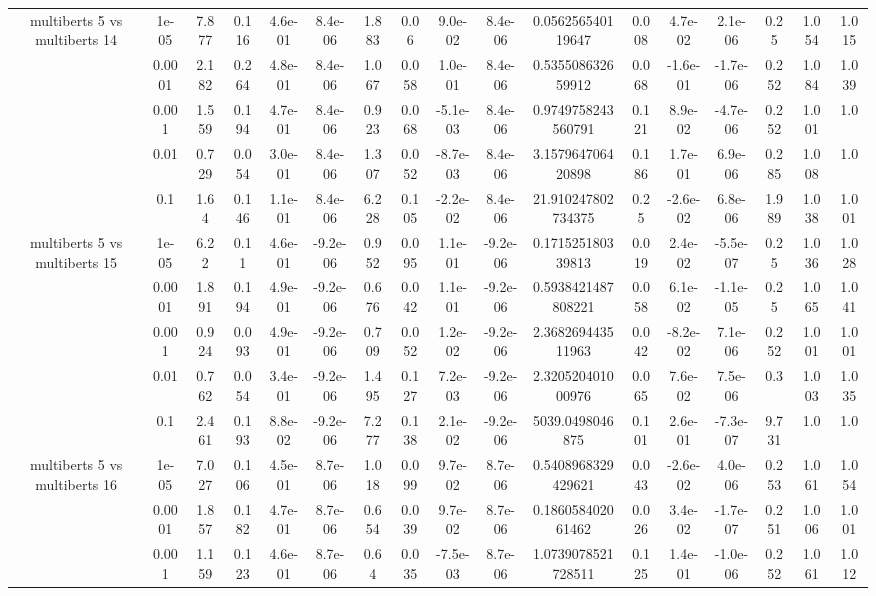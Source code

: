 \begin{tabular}{|c|c|c|c|c|c|c|c|c|c|c|c|c|c|c|c|c|}
\hline
\multirow{5}{*}{multiberts 5 vs multiberts 14} & 1e-05 & 7.877 & 0.116 & 4.6e-01 & 8.4e-06 & 1.883 & 0.06 & 9.0e-02 & 8.4e-06 & 0.056256540119647 & 0.008 & 4.7e-02 & 2.1e-06 & 0.25 & 1.054 & 1.015 \\
 & 0.0001 & 2.182 & 0.264 & 4.8e-01 & 8.4e-06 & 1.067 & 0.058 & 1.0e-01 & 8.4e-06 & 0.535508632659912 & 0.068 & -1.6e-01 & -1.7e-06 & 0.252 & 1.084 & 1.039 \\
 & 0.001 & 1.559 & 0.194 & 4.7e-01 & 8.4e-06 & 0.923 & 0.068 & -5.1e-03 & 8.4e-06 & 0.9749758243560791 & 0.121 & 8.9e-02 & -4.7e-06 & 0.252 & 1.001 & 1.0 \\
 & 0.01 & 0.729 & 0.054 & 3.0e-01 & 8.4e-06 & 1.307 & 0.052 & -8.7e-03 & 8.4e-06 & 3.157964706420898 & 0.186 & 1.7e-01 & 6.9e-06 & 0.285 & 1.008 & 1.0 \\
 & 0.1 & 1.64 & 0.146 & 1.1e-01 & 8.4e-06 & 6.228 & 0.105 & -2.2e-02 & 8.4e-06 & 21.910247802734375 & 0.25 & -2.6e-02 & 6.8e-06 & 1.989 & 1.038 & 1.001 \\
\hline
\multirow{5}{*}{multiberts 5 vs multiberts 15} & 1e-05 & 6.22 & 0.11 & 4.6e-01 & -9.2e-06 & 0.952 & 0.095 & 1.1e-01 & -9.2e-06 & 0.171525180339813 & 0.019 & 2.4e-02 & -5.5e-07 & 0.25 & 1.036 & 1.028 \\
 & 0.0001 & 1.891 & 0.194 & 4.9e-01 & -9.2e-06 & 0.676 & 0.042 & 1.1e-01 & -9.2e-06 & 0.5938421487808221 & 0.058 & 6.1e-02 & -1.1e-05 & 0.25 & 1.065 & 1.041 \\
 & 0.001 & 0.924 & 0.093 & 4.9e-01 & -9.2e-06 & 0.709 & 0.052 & 1.2e-02 & -9.2e-06 & 2.368269443511963 & 0.042 & -8.2e-02 & 7.1e-06 & 0.252 & 1.001 & 1.001 \\
 & 0.01 & 0.762 & 0.054 & 3.4e-01 & -9.2e-06 & 1.495 & 0.127 & 7.2e-03 & -9.2e-06 & 2.320520401000976 & 0.065 & 7.6e-02 & 7.5e-06 & 0.3 & 1.003 & 1.035 \\
 & 0.1 & 2.461 & 0.193 & 8.8e-02 & -9.2e-06 & 7.277 & 0.138 & 2.1e-02 & -9.2e-06 & 5039.0498046875 & 0.101 & 2.6e-01 & -7.3e-07 & 9.731 & 1.0 & 1.0 \\
\hline
\multirow{5}{*}{multiberts 5 vs multiberts 16} & 1e-05 & 7.027 & 0.106 & 4.5e-01 & 8.7e-06 & 1.018 & 0.099 & 9.7e-02 & 8.7e-06 & 0.5408968329429621 & 0.043 & -2.6e-02 & 4.0e-06 & 0.253 & 1.061 & 1.054 \\
 & 0.0001 & 1.857 & 0.182 & 4.7e-01 & 8.7e-06 & 0.654 & 0.039 & 9.7e-02 & 8.7e-06 & 0.186058402061462 & 0.026 & 3.4e-02 & -1.7e-07 & 0.251 & 1.006 & 1.001 \\
 & 0.001 & 1.159 & 0.123 & 4.6e-01 & 8.7e-06 & 0.64 & 0.035 & -7.5e-03 & 8.7e-06 & 1.0739078521728511 & 0.125 & 1.4e-01 & -1.0e-06 & 0.252 & 1.061 & 1.012 \\

\end{tabular}
